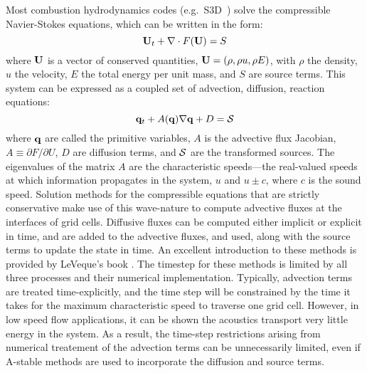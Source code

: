 Most combustion hydrodynamics codes
(e.g.\ S3D~\cite{s3d}) solve the
compressible Navier-Stokes equations, which can be written in the form:
\begin{equation}
{\bf U}_t + \nabla \cdot F({\bf U}) = S
\end{equation}
where ${\bf U}$ is a vector of conserved quantities, ${\bf U} = (\rho, \rho u,
\rho E)$, with $\rho$ the density, $u$ the velocity, $E$ the total
energy per unit mass, and $S$ are source terms.  This system
can be expressed as a coupled set of advection, diffusion, reaction
equations:
\begin{equation}
{\bf q}_t + A({\bf q}) \nabla {\bf q} + D = {\cal S}
\end{equation}
where ${\bf q}$ are called the primitive variables, $A$ is the advective
flux Jacobian, $A \equiv \partial F / \partial U$, $D$ are diffusion terms, 
and ${\cal S}$ are the transformed sources.  The eigenvalues of the
matrix $A$ are the characteristic speeds---the real-valued speeds at which
information propagates in the system, $u$ and $u
\pm c$, where $c$ is the sound speed.  Solution methods for the
compressible equations that are strictly conservative make use of this wave-nature to compute advective fluxes
at the interfaces of grid cells.  Diffusive fluxes can be computed 
either implicit or explicit in time, and are added to the advective fluxes,
and used, along with the source terms to update the state in time.  An
excellent introduction to these methods is provided by LeVeque's book
\cite{leveque}.  The timestep for these methods is limited by all three processes
and their numerical implementation.  Typically, advection terms are treated
time-explicitly, and the time step will be constrained by the time
it takes for the maximum characteristic speed to traverse one grid cell.
However, in low speed flow applications, it can be shown the acoustics 
transport very little energy in the system.  As a result, the time-step 
restrictions arising from numerical treatement of the advection terms
can be unnecessarily limited, even if A-stable methods are used to incorporate
the diffusion and source terms.

